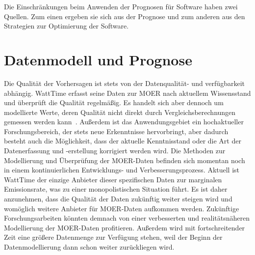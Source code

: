 Die Einschränkungen beim Anwenden der Prognosen für Software haben zwei Quellen.
Zum einen ergeben sie sich aus der Prognose und zum anderen aus den Strategien zur Optimierung der Software.

\section{Datenmodell und Prognose}
Die Qualität der Vorhersagen ist stets von der Datenqualität- und verfügbarkeit abhängig.
WattTime erfasst seine Daten zur \ac{MOER} nach aktuellem Wissensstand und überprüft die Qualität regelmäßig.
Es handelt sich aber dennoch um modellierte Werte, deren Qualität nicht direkt durch Vergleichsberechnungen gemessen werden kann~\cite{WattTime.2022}.
Außerdem ist das Anwendungsgebiet ein hochaktueller Forschungsbereich, der stets neue Erkenntnisse hervorbringt, aber dadurch besteht auch die Möglichkeit, dass der aktuelle Kenntnisstand oder die Art der Datenerfassung und -erstellung korrigiert werden wird.
Die Methoden zur Modellierung und Überprüfung der \ac{MOER}-Daten befinden sich momentan noch in einem kontinuierlichen Entwicklungs- und Verbesserungsprozess.
Aktuell ist WattTime der einzige Anbieter dieser spezifischen Daten zur marginalen Emissionsrate, was zu einer monopolistischen Situation führt.
Es ist daher anzunehmen, dass die Qualität der Daten zukünftig weiter steigen wird und womöglich weitere Anbieter für \ac{MOER}-Daten aufkommen werden.
Zukünftige Forschungsarbeiten könnten demnach von einer verbesserten und realitätsnäheren Modellierung der \ac{MOER}-Daten profitieren.
Außerdem wird mit fortschreitender Zeit eine größere Datenmenge zur Verfügung stehen, weil der Beginn der Datenmodellierung dann schon weiter zurückliegen wird.

